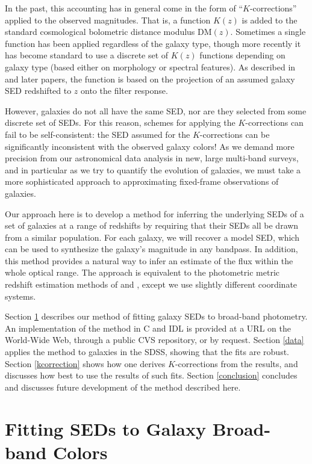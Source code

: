 \documentclass[10pt,preprint]{aastex}
\begin{document}
In the past, this accounting has in general come in the form of
``$K$-corrections'' applied to the observed magnitudes. That is, a
function $K(z)$ is added to the standard cosmological bolometric
distance modulus $\mathrm{DM}(z)$. Sometimes a single function has
been applied regardless of the galaxy type, though more recently it
has become standard to use a discrete set of $K(z)$ functions
depending on galaxy type (based either on morphology or spectral
features). As described in \cite{oke68a} and later papers, the
function is based on the projection of an assumed galaxy SED
redshifted to $z$ onto the filter response.

However, galaxies do not all have the same SED, nor are they selected
from some discrete set of SEDs. For this reason, schemes for applying
the $K$-corrections can fail to be self-consistent: the SED assumed
for the $K$-corrections can be significantly inconsistent with the
observed galaxy colors! As we demand more precision from our
astronomical data analysis in new, large multi-band surveys, and in
particular as we try to quantify the evolution of galaxies, we must
take a more sophisticated approach to approximating fixed-frame
observations of galaxies.

Our approach here is to develop a method for inferring the underlying
SEDs of a set of galaxies at a range of redshifts by requiring that
their SEDs all be drawn from a similar population. For each galaxy, we
will recover a model SED, which can be used to synthesize the galaxy's
magnitude in any bandpass. In addition, this method provides a natural
way to infer an estimate of the flux within the whole optical range.
The approach is equivalent to the photometric metric redshift
estimation methods of \citet{csabai99a} and \citet{budavari00a}, 
except we use slightly different coordinate systems.

Section \ref{sedfit} describes our method of fitting galaxy SEDs to
broad-band photometry. An implementation of the method in C and IDL is
provided at a URL on the World-Wide Web, through a public CVS
repository, or by request.  Section \ref{data} applies the method to
galaxies in the SDSS, showing that the fits are robust. Section
\ref{kcorrection} shows how one derives $K$-corrections from the
results, and discusses how best to use the results of such
fits. Section \ref{conclusion} concludes and discusses future
development of the method described here.

\section{Fitting SEDs to Galaxy Broad-band Colors}
\label{sedfit}
\end{document}
